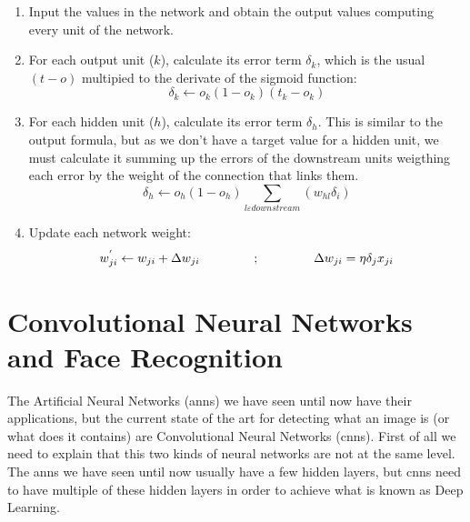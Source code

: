 		\begin{enumerate}

			\item Input the values in the network and obtain the output values computing every unit of the network.
			\item For each output unit ($k$), calculate its error term $\delta_k$, which is the usual $(t-o)$ multipied to the derivate of the sigmoid function:
				\begin{equation}
					\label{backpropagation_output_error}
					\delta_k \leftarrow o_k (1 - o_k)(t_k - o_k)
				\end{equation}				

			\item For each hidden unit ($h$), calculate its error term $\delta_h$. This is similar to the output formula, but as we don't have a target value for a hidden unit, we must calculate it summing up the errors of the downstream units weigthing each error by the weight of the connection that links them. 
				\begin{equation}
					\label{backpropagation_hidden_error}
					\delta_h \leftarrow o_h (1 - o_h) \sum_{l \varepsilon downstream} (w_{hl} \delta_i)
				\end{equation}

			\item Update each network weight:
				\begin{equation}
					\label{backpropagation_weight_update}
					w^{'}_{ji} \leftarrow w_{ji} + \Delta w_{ji} \hspace{1.5cm} ; \hspace{1.5cm} \Delta w_{ji} = \eta \delta_j x_{ji}
				\end{equation}

		\end{enumerate} 


\section{Convolutional Neural Networks and Face Recognition}
The Artificial Neural Networks (\glspl{ann}) we have seen until now have their applications, but the current state of the art for detecting what an image is (or what does it contains) are Convolutional Neural Networks (\glspl{cnn}). First of all we need to explain that this two kinds of neural networks are not at the same level. The \glspl{ann} we have seen until now usually have a few hidden layers, but \glspl{cnn} need to have multiple of these hidden layers in order to achieve what is known as Deep Learning. 

